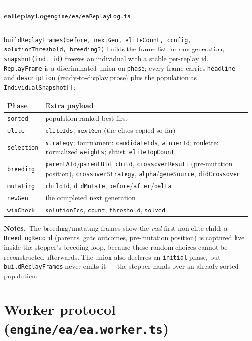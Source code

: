 \documentclass[11pt,a4paper]{report}
\newcommand{\srcfile}[1]{\texttt{\small #1}}   %
\newcommand{\ts}[1]{\texttt{#1}}               %
\newenvironment{apientry}[2]{%
  \par\medskip\noindent
  \begin{minipage}{\textwidth}
  \hrule\vspace{0.6ex}
  {\large\ttfamily\bfseries #1}\hfill{\footnotesize\srcfile{#2}}
  \vspace{0.4ex}\hrule\medskip
}{%
  \end{minipage}\par\medskip
}
\newcommand{\apifield}[1]{\par\smallskip\noindent\textbf{#1.}\ }
\begin{document}
\begin{apientry}{eaReplayLog}{engine/ea/eaReplayLog.ts}
\ts{buildReplayFrames(before, nextGen, eliteCount, config,
solutionThreshold, breeding?)} builds the frame list for one generation;
\ts{snapshot(ind, id)} freezes an individual with a stable per-replay id.
\ts{ReplayFrame} is a discriminated union on \ts{phase}; every frame
carries \ts{headline} and \ts{description} (ready-to-display prose) plus
the population as \ts{IndividualSnapshot[]}:
\begin{center}
\begin{tabularx}{\textwidth}{l X}
  \toprule
  \textbf{Phase} & \textbf{Extra payload} \\
  \midrule
  \ts{sorted}    & population ranked best-first \\
  \ts{elite}     & \ts{eliteIds}; \ts{nextGen} (the elites copied so far) \\
  \ts{selection} & \ts{strategy}; tournament: \ts{candidateIds},
                   \ts{winnerId}; roulette: normalized \ts{weights};
                   elitist: \ts{eliteTopCount} \\
  \ts{breeding}  & \ts{parentAId}/\ts{parentBId}, \ts{child},
                   \ts{crossoverResult} (pre-mutation position),
                   \ts{crossoverStrategy}, \ts{alpha}/\ts{geneSource},
                   \ts{didCrossover} \\
  \ts{mutating}  & \ts{childId}, \ts{didMutate},
                   \ts{before}/\ts{after}/\ts{delta} \\
  \ts{newGen}    & the completed next generation \\
  \ts{winCheck}  & \ts{solutionIds}, \ts{count}, \ts{threshold}, \ts{solved} \\
  \bottomrule
\end{tabularx}
\end{center}
\apifield{Notes}The breeding/mutating frames show the \emph{real} first
non-elite child: a \ts{BreedingRecord} (parents, gate outcomes,
pre-mutation position) is captured live inside the stepper's breeding
loop, because those random choices cannot be reconstructed afterwards.
The union also declares an \ts{initial} phase, but \ts{buildReplayFrames}
never emits it --- the stepper hands over an already-sorted population.
\end{apientry}

\section{Worker protocol (\srcfile{engine/ea/ea.worker.ts})}
\end{document}
